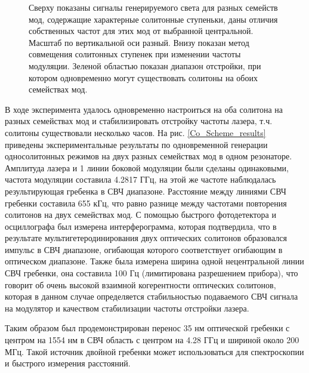 \begin{figure}[ht]
\begin{minipage}[ht]{1\linewidth}
\end{minipage}
\caption{Сверху показаны сигналы генерируемого света для разных семейств мод, содержащие характерные солитонные ступеньки, даны отличия собственных частот для этих мод от выбранной центральной. Масштаб по вертикальной оси разный. Внизу показан метод совмещения солитонных ступенек при изменении частоты модуляции. Зеленой областью показан диапазон отстройки, при котором одновременно могут существовать солитоны на обоих семействах мод.}
\label{Figure2}
\end{figure}

В ходе эксперимента удалось одновременно настроиться на оба солитона на разных семействах мод и стабилизировать отстройку частоты лазера, т.ч. солитоны существовали несколько часов. На рис. \ref{Co_Scheme_results} приведены экспериментальные результаты по одновременной генерации односолитонных режимов на двух разных семействах мод в одном резонаторе. Амплитуда лазера и 1 линии боковой модуляции были сделаны одинаковыми, частота модуляции составила 4.2817 ГГц, на этой же частоте наблюдалась результирующая гребенка в СВЧ диапазоне. Расстояние между линиями СВЧ гребенки составила 655 кГц, что равно разнице между частотами повторения солитонов на двух семействах мод. С помощью быстрого фотодетектора и осциллографа был измерена интерферограмма, которая подтвердила, что в результате мультигетеродинирования двух оптических солитонов образовался импульс в СВЧ диапазоне, огибающая которого соответствует огибающим в оптическом диапазоне. Также была измерена ширина одной нецентральной линии СВЧ гребенки, она составила 100 Гц (лимитирована разрешением прибора), что говорит об очень высокой взаимной когерентности оптических солитонов, которая в данном случае определяется стабильностью подаваемого СВЧ сигнала на модулятор и качеством стабилизации частоты отстройки лазера.

Таким образом был продемонстрирован перенос 35 нм оптической гребенки с центром на 1554 нм в СВЧ область с центром на 4.28 ГГц и шириной около 200 МГц. Такой источник двойной гребенки может использоваться для спектроскопии и быстрого измерения расстояний.

